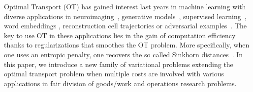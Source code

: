 Optimal Transport (OT) has gained interest last years in machine learning with diverse applications in neuroimaging~\citep{janati2020multi}, generative models~\citep{arjovsky2017wasserstein,salimans2018improving}, supervised learning~\citep{courty2016optimal}, word embeddings \citep{alvarez2018towards}, reconstruction cell trajectories \citep{yang2020predicting,schiebinger2019optimal} or adversarial examples~\citep{wong2019wasserstein}. The key to use OT in these applications lies in the gain of computation efficiency thanks to regularizations that smoothes the OT problem. More specifically, when one uses an entropic penalty, one recovers the so called Sinkhorn distances~\citep{cuturi2013sinkhorn}. In this paper, we introduce a new family of variational problems extending the optimal transport problem when multiple costs are involved with various applications in fair division of goods/work and operations research problems. 

